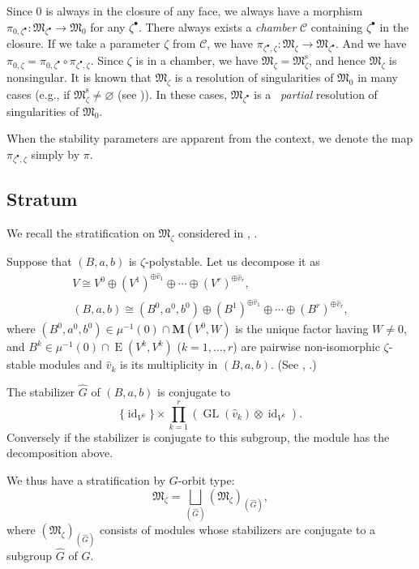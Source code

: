 \documentclass[pdftex]{sigma}
\theoremstyle{definition}
\numberwithin{equation}{section}
\newcommand{\GL}{\operatorname{GL}}
\newcommand{\id}{\operatorname{id}}
\newcommand{\bM}{{\mathbf M}} %
\newcommand{\M}{{\mathfrak M}} %
\newcommand{\Mreg}{\M^{\operatorname{s}}}
\newcommand{\HomE}{\operatorname{E}}
\begin{document}
Since $0$ is always in the closure of any face, we always have a
morphism
\(
  \pi_{0,\zeta^\bullet}\colon \M_{\zeta^\bullet}\to \M_0
\)
for any $\zeta^\bullet$. There always exists a {\it chamber\/} $\mathcal C$
containing $\zeta^\bullet$ in the closure. If we take a parameter $\zeta$
from $\mathcal C$, we have
\(
  \pi_{\zeta^\bullet,\zeta}\colon \M_{\zeta}\to \M_{\zeta^\bullet}.
\)
And we have $\pi_{0,\zeta} =
\pi_{0,\zeta^\bullet}\circ\pi_{\zeta^\bullet,\zeta}$. Since
$\zeta$ is in a chamber, we have $\M_{\zeta} = \Mreg_{\zeta}$, and
hence $\M_{\zeta}$ is nonsingular. It is known that
$\M_{\zeta}$ is a resolution of singularities of $\M_0$ in many cases
(e.g., if $\Mreg_{\zeta}\neq\varnothing$ (see
\cite[Theorem~4.1]{Na-quiver})). In these cases, $\M_{\zeta^\bullet}$ is a~{\it
  partial} resolution of singularities of $\M_0$.

When the stability parameters are apparent from the context, we denote
the map $\pi_{\zeta^\bullet,\zeta}$ simply by $\pi$.

\subsection{Stratum}\label{subsec:stratum}

We recall the stratif\/ication on $\M_\zeta$ considered in
\cite[Section~6]{Na-quiver}, \cite[Section~3]{Na-alg}.

Suppose that $(B,a,b)$ is $\zeta$-polystable. Let us decompose it as
\begin{gather}
     V \cong V^0 \oplus (V^1)^{\oplus {\widehat v}_1}\oplus \cdots \oplus
   (V^r)^{\oplus {\widehat v}_r},
\nonumber\\
     (B,a,b) \cong (B^0,a^0,b^0) \oplus
   (B^1)^{\oplus {\widehat v}_1} \oplus \cdots \oplus
   (B^r)^{\oplus {\widehat v}_r},\label{eq:decomp}
\end{gather}
where $(B^0,a^0,b^0)\in\mu^{-1}(0)\cap\bM(V^0,W)$ is the unique factor
having $W\neq 0$, and $B^k\in \mu^{-1}(0)\cap\HomE(V^k,V^k)$
($k=1,\dots,r$) are pairwise non-isomorphic $\zeta$-stable modules
and ${\widehat v}_k$ is its multiplicity in $(B,a,b)$. (See
\cite[6.5]{Na-quiver}, \cite[3.27]{Na-alg}.)

The stabilizer $\widehat G$ of $(B,a,b)$ is conjugate to
\[
   \{ \id_{V^0} \} \times
   \prod_{k=1}^r \left(\GL(\widehat{v}_k)\otimes \id_{V^k}\right).
\]
Conversely if the stabilizer is conjugate to this subgroup, the module
has the decomposition above.

We thus have a stratif\/ication by $G$-orbit type:
\begin{equation*}
   \M_\zeta = \bigsqcup_{(\widehat G)} (\M_\zeta)_{(\widehat G)},
\end{equation*}
where $(\M_\zeta)_{(\widehat G)}$ consists of modules whose
stabilizers are conjugate to a subgroup $\widehat G$ of $G$.
\end{document}
